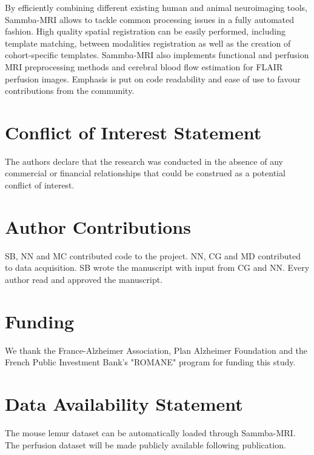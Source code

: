 \documentclass[utf8, a4paper, final, crop]{frontiersSCNS}
\begin{document}
By efficiently combining different existing human and animal neuroimaging
tools, Sammba-MRI allows to tackle common processing issues in a fully
automated fashion. High quality spatial registration can be easily performed, 
including template matching, between modalities registration as well as
the creation of cohort-specific templates. Sammba-MRI also implements
functional and perfusion MRI preprocessing methods and cerebral blood flow
estimation for FLAIR perfusion images. Emphasis is put on code readability
and ease of use to favour contributions from the community.

\section*{Conflict of Interest Statement}

The authors declare that the research was conducted in the absence
of any commercial or financial relationships that could be construed
as a potential conflict of interest.

\section*{Author Contributions}

SB, NN and MC contributed code to the project. NN, CG and MD contributed
to data acquisition. SB wrote the manuscript with input from CG and NN.
Every author read and approved the manuscript.

\section*{Funding}

We thank the France-Alzheimer Association, Plan Alzheimer Foundation
and the French Public Investment Bank's "ROMANE" program for funding this study.

\section*{Data Availability Statement}

The mouse lemur dataset can be automatically loaded through Sammba-MRI. The perfusion
dataset will be made publicly available following publication.


 


\end{document}
